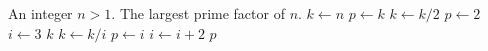 
\begin{algorithmic}[1]
\Require An integer $n > 1$.
\Ensure The largest prime factor of $n$.
\State $k \gets n$
\State $p \gets k$
  \State $k \gets k / 2$
  \State $p \gets 2$
\EndWhile
\State $i \gets 3$
    \State \Return $k$
  \EndIf
    \State $k \gets k / i$
    \State $p \gets i$
  \EndWhile
  \State $i \gets i + 2$
\EndWhile
\State \Return $p$
\end{algorithmic}
